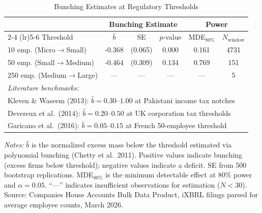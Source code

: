 \begin{table}[htbp]
\centering
\caption{Bunching Estimates at Regulatory Thresholds}
\label{tab:bunching}
\begin{threeparttable}
\begin{tabular}{lccccc}
\toprule
& \multicolumn{3}{c}{Bunching Estimate} & \multicolumn{2}{c}{Power} \\
\cmidrule(lr){2-4} \cmidrule(lr){5-6}
Threshold & $\hat{b}$ & SE & $p$-value & MDE$_{80\%}$ & $N_{\text{window}}$ \\
\midrule
10 emp. (Micro$\to$Small) & -0.368 & (0.065) & 0.000 & 0.161 & 4731 \\
50 emp. (Small$\to$Medium) & -0.464 & (0.309) & 0.134 & 0.769 & 151 \\
250 emp. (Medium$\to$Large) & --- & --- & --- & --- & 5 \\
\midrule
\multicolumn{6}{l}{\textit{Literature benchmarks:}} \\
\multicolumn{6}{l}{\quad Kleven \& Waseem (2013): $\hat{b} = 0.30$--$1.00$ at Pakistani income tax notches} \\
\multicolumn{6}{l}{\quad Devereux et al.\ (2014): $\hat{b} = 0.20$--$0.50$ at UK corporation tax thresholds} \\
\multicolumn{6}{l}{\quad Garicano et al.\ (2016): $\hat{b} = 0.05$--$0.15$ at French 50-employee threshold} \\
\bottomrule
\end{tabular}
\begin{tablenotes}[flushleft]
\small
\item \textit{Notes:} $\hat{b}$ is the normalized excess mass below the threshold estimated via
polynomial bunching (Chetty et al.\ 2011). Positive values indicate bunching (excess firms below
threshold); negative values indicate a deficit. SE from 500 bootstrap replications. MDE$_{80\%}$
is the minimum detectable effect at 80\% power and $\alpha = 0.05$. ``---'' indicates insufficient
observations for estimation ($N < 30$). Source: Companies House Accounts Bulk Data Product,
iXBRL filings parsed for average employee counts, March 2026.
\end{tablenotes}
\end{threeparttable}
\end{table}

